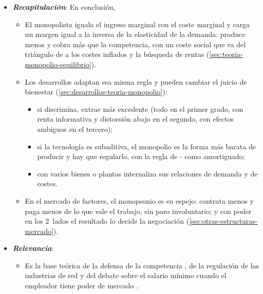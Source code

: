 \documentclass[11pt]{article}
\begin{document}
\begin{itemize}
\item \textbf{\emph{Recapitulación}}: En conclusión,
  \begin{itemize}
  \item El monopolista iguala el ingreso marginal con el coste marginal y carga un margen igual a la inversa de la elasticidad de la demanda: produce menos y cobra más que la competencia, con un coste social que va del triángulo de  a los costes inflados y la búsqueda de rentas (\ref{sec:teoria-monopolio-equilibrio}).
  \item Los desarrollos adaptan esa misma regla y pueden cambiar el juicio de bienestar (\ref{sec:desarrollos-teoria-monopolio}):
    \begin{itemize}
    \item si discrimina, extrae más excedente (todo en el primer grado, con renta informativa y distorsión abajo en el segundo, con efectos ambiguos en el tercero);
    \item si la tecnología es subaditiva, el monopolio es la forma más barata de producir y hay que regularlo, con la regla de - como  amortiguado;
    \item con varios bienes o plantas internaliza sus relaciones de demanda y de costes.
    \end{itemize}
  \item En el mercado de factores, el monopsonio es su espejo: contrata menos y paga menos de lo que vale el trabajo, sin paro involuntario; y con poder en los 2~lados el resultado lo decide la negociación (\ref{sec:otras-estructuras-mercado}).
  \end{itemize}
\item \textbf{\emph{Relevancia}}:
  \begin{itemize}
  \item Es la base teórica de la defensa de la competencia , de la regulación de las industrias de red  y del debate sobre el salario mínimo cuando el empleador tiene poder de mercado .


\end{itemize}
\end{itemize}
\end{document}
